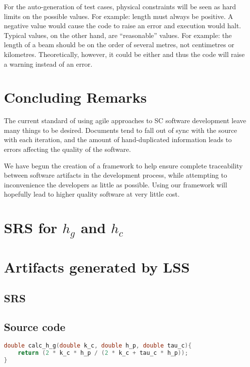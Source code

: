 \documentclass{sig-alternate-05-2015}
\newcommand{\lss}{LSS}
\begin{document}
For the auto-generation of test cases, physical constraints will be seen as hard
limits on the possible values. For example: length must always be positive.  A
negative value would cause the code to raise an error and execution would
halt. Typical values, on the other hand, are ``reasonable'' values. For example:
the length of a beam should be on the order of several metres, not centimetres
or kilometres. Theoretically, however, it could be either and thus the code will
raise a warning instead of an error.

    
\section{Concluding Remarks} \label{sec:conclusion}

The current standard of using agile approaches to SC software development leave
many things to be desired. Documents tend to fall out of sync with the source
with each iteration, and the amount of hand-duplicated information leads to
errors affecting the quality of the software.

We have begun the creation of a framework to help ensure complete traceability
between software artifacts in the development process, while attempting to
inconvenience the developers as little as possible. Using our framework will
hopefully lead to higher quality software at very little cost.



  
\appendix
\section{SRS for $h_g$ and $h_c$} \label{app:srs}


\section{Artifacts generated by \lss} \label{app:gen}
\subsection{SRS}
\subsection{Source code}
\begin{lstlisting}[language=C, frame=single, showstringspaces=false, basicstyle=\tiny]
double calc_h_g(double k_c, double h_p, double tau_c){
    return (2 * k_c * h_p / (2 * k_c + tau_c * h_p));
}
\end{lstlisting}
\end{document}

